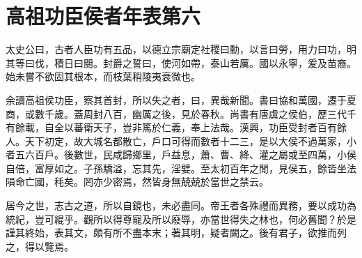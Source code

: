 \onecolumn
\chapter{高祖功臣侯者年表第六}

太史公曰，古者人臣功有五品，以德立宗廟定社稷曰勳，以言曰勞，用力曰功，明其等曰伐，積日曰閱。封爵之誓曰，使河如帶，泰山若厲。國以永寧，爰及苗裔。始未嘗不欲固其根本，而枝葉稍陵夷衰微也。

余讀高祖侯功臣，察其首封，所以失之者，曰，異哉新聞。書曰協和萬國，遷于夏商，或數千歲。蓋周封八百，幽厲之後，見於春秋。尚書有唐虞之侯伯，歷三代千有餘載，自全以蕃衛天子，豈非篤於仁義，奉上法哉。漢興，功臣受封者百有餘人。天下初定，故大城名都散亡，戶口可得而數者十二三，是以大侯不過萬家，小者五六百戶。後數世，民咸歸鄉里，戶益息，蕭、曹、絳、灌之屬或至四萬，小侯自倍，富厚如之。子孫驕溢，忘其先，淫嬖。至太初百年之閒，見侯五，餘皆坐法隕命亡國，秏矣。罔亦少密焉，然皆身無兢兢於當世之禁云。

居今之世，志古之道，所以自鏡也，未必盡同。帝王者各殊禮而異務，要以成功為統紀，豈可緄乎。觀所以得尊寵及所以廢辱，亦當世得失之林也，何必舊聞？於是謹其終始，表其文，頗有所不盡本末；著其明，疑者闕之。後有君子，欲推而列之，得以覽焉。

\twocolumn